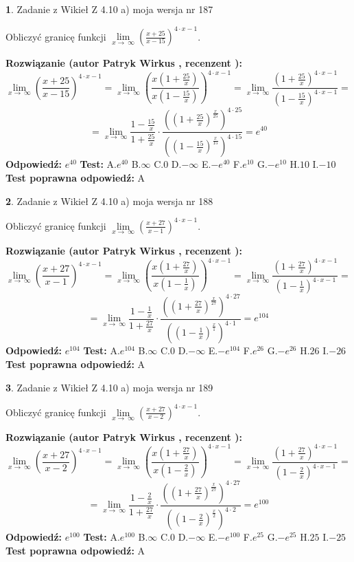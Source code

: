 \documentclass[12pt, a4paper]{article}
\theoremstyle{definition} %
\newtheorem{zad}{}
\newcommand{\zadStart}[1]{\begin{zad}#1\newline}
\newcommand{\zadStop}{\end{zad}}
\newcommand{\rozwStart}[2]{\noindent \textbf{Rozwiązanie (autor #1 , recenzent #2): }\newline}
\newcommand{\rozwStop}{\newline}
\newcommand{\odpStart}{\noindent \textbf{Odpowiedź:}\newline}
\newcommand{\odpStop}{\newline}
\newcommand{\testStart}{\noindent \textbf{Test:}\newline}
\newcommand{\testStop}{\newline}
\newcommand{\kluczStart}{\noindent \textbf{Test poprawna odpowiedź:}\newline}
\newcommand{\kluczStop}{\newline}
\begin{document}
\zadStart{Zadanie z Wikieł Z 4.10 a) moja wersja nr 187}

Obliczyć granicę funkcji  $\lim\limits_{x\to\ \infty}(\frac{x+25}{x-15})^{4\cdot x-1}$.
\zadStop
\rozwStart{Patryk Wirkus}{}
$$\lim\limits_{x\to\ \infty}(\frac{x+25}{x-15})^{4\cdot x-1} = \lim\limits_{x\to\ \infty}(\frac{x(1+\frac{25}{x})}{x(1-\frac{15}{x})})^{4\cdot x-1}=\lim\limits_{x\to\ \infty}\frac{(1+\frac{25}{x})^{4\cdot x-1}}{(1-\frac{15}{x})^{4\cdot x-1}}=$$
$$=\lim\limits_{x\to\ \infty}\frac{1-\frac{15}{x}}{1+\frac{25}{x}}\cdot\frac{((1+\frac{25}{x})^{\frac{x}{25}})^{4\cdot25}}{((1-\frac{15}{x})^{\frac{x}{15}})^{4\cdot15}}=e^{40}$$
\rozwStop
\odpStart
$e^{40}$
\odpStop
\testStart
A.$e^{40}$ B.$\infty$ C.$0$ D.$-\infty$ E.$-e^{40}$
F.$e^{10}$ G.$-e^{10}$
H.$10$
I.$-10$
\testStop
\kluczStart
A
\kluczStop



\zadStart{Zadanie z Wikieł Z 4.10 a) moja wersja nr 188}

Obliczyć granicę funkcji  $\lim\limits_{x\to\ \infty}(\frac{x+27}{x-1})^{4\cdot x-1}$.
\zadStop
\rozwStart{Patryk Wirkus}{}
$$\lim\limits_{x\to\ \infty}(\frac{x+27}{x-1})^{4\cdot x-1} = \lim\limits_{x\to\ \infty}(\frac{x(1+\frac{27}{x})}{x(1-\frac{1}{x})})^{4\cdot x-1}=\lim\limits_{x\to\ \infty}\frac{(1+\frac{27}{x})^{4\cdot x-1}}{(1-\frac{1}{x})^{4\cdot x-1}}=$$
$$=\lim\limits_{x\to\ \infty}\frac{1-\frac{1}{x}}{1+\frac{27}{x}}\cdot\frac{((1+\frac{27}{x})^{\frac{x}{27}})^{4\cdot27}}{((1-\frac{1}{x})^{\frac{x}{1}})^{4\cdot1}}=e^{104}$$
\rozwStop
\odpStart
$e^{104}$
\odpStop
\testStart
A.$e^{104}$ B.$\infty$ C.$0$ D.$-\infty$ E.$-e^{104}$
F.$e^{26}$ G.$-e^{26}$
H.$26$
I.$-26$
\testStop
\kluczStart
A
\kluczStop



\zadStart{Zadanie z Wikieł Z 4.10 a) moja wersja nr 189}

Obliczyć granicę funkcji  $\lim\limits_{x\to\ \infty}(\frac{x+27}{x-2})^{4\cdot x-1}$.
\zadStop
\rozwStart{Patryk Wirkus}{}
$$\lim\limits_{x\to\ \infty}(\frac{x+27}{x-2})^{4\cdot x-1} = \lim\limits_{x\to\ \infty}(\frac{x(1+\frac{27}{x})}{x(1-\frac{2}{x})})^{4\cdot x-1}=\lim\limits_{x\to\ \infty}\frac{(1+\frac{27}{x})^{4\cdot x-1}}{(1-\frac{2}{x})^{4\cdot x-1}}=$$
$$=\lim\limits_{x\to\ \infty}\frac{1-\frac{2}{x}}{1+\frac{27}{x}}\cdot\frac{((1+\frac{27}{x})^{\frac{x}{27}})^{4\cdot27}}{((1-\frac{2}{x})^{\frac{x}{2}})^{4\cdot2}}=e^{100}$$
\rozwStop
\odpStart
$e^{100}$
\odpStop
\testStart
A.$e^{100}$ B.$\infty$ C.$0$ D.$-\infty$ E.$-e^{100}$
F.$e^{25}$ G.$-e^{25}$
H.$25$
I.$-25$
\testStop
\kluczStart
A
\kluczStop
\end{document}
